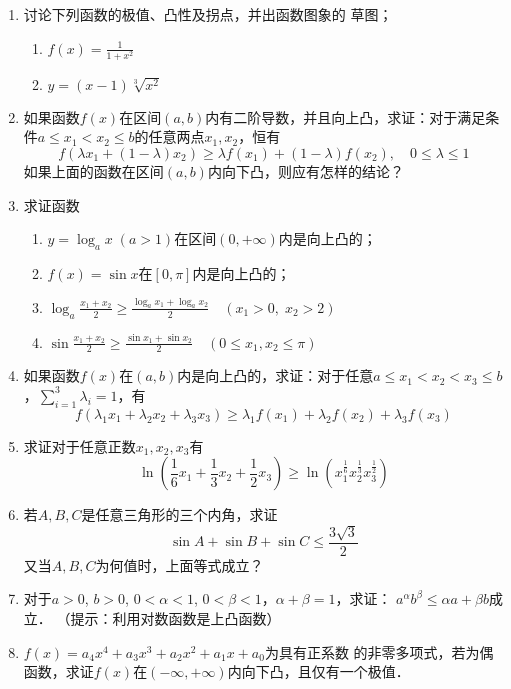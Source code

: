 \begin{ex}
\begin{enumerate}
    \item 讨论下列函数的极值、凸性及拐点，并出函数图象的
    草图；
\begin{multicols}{2}
\begin{enumerate}
    \item $f(x)=\frac{1}{1+x^2}$
    \item $y=(x-1)\sqrt[3]{x^2}$
\end{enumerate}
\end{multicols}
\item 如果函数$f(x)$在区间$(a,b)$内有二阶导数，并且向上凸，求证：对于满足条件$a\le x_1<x_2\le b$的任意两点$x_1,x_2$，恒有
\[f (\lambda x_1+ (1-\lambda) x_2) \ge \lambda f (x_1) + (1-\lambda)f (x_2) ,\quad  0\le\lambda\le 1\]
如果上面的函数在区间$(a,b)$内向下凸，则应有怎样的结论？
\item 求证函数
\begin{enumerate}
    \item $y=\log_ax \; (a>1)$在区间$(0,+\infty)$内是向上凸的；
    \item $f(x)=\sin x$在$[0,\pi]$内是向上凸的；
    \item $\log_a\frac{x_1+x_2}{2}\ge \frac{\log_a x_1+\log_a x_2}{2}\quad (x_1> 0,\; x_2>2)$
    \item $\sin\frac{x_1+x_2}{2}\ge \frac{\sin x_1+\sin x_2}{2}\quad  (0\le x_1,x_2\le \pi)$
\end{enumerate}

\item 如果函数$f(x)$在$(a,b)$内是向上凸的，求证：对于任意$a\le x_1<x_2<x_3\le b$，$\sum^3_{i=1}\lambda_i=1$，有
\[f(\lambda_1x_1+\lambda_2x_2+\lambda_3x_3)\ge \lambda_1f(x_1)+\lambda_2f(x_2)+\lambda_3f(x_3)\]

\item  求证对于任意正数$x_1,x_2,x_3$有
\[\ln\left(\frac{1}{6}x_1+\frac{1}{3}x_2+\frac{1}{2}x_3\right) \ge \ln \left(x_1^{\tfrac{1}{6}}x_2^{\tfrac{1}{3}}x_3^{\tfrac{1}{2}} \right)\]
\item  若$A,B,C$是任意三角形的三个内角，求证
\[\sin A+\sin B+\sin C\le \frac{3\sqrt{3}}{2}\]
又当$A,B,C$为何值时，上面等式成立？
\item  对于$a>0$, $b>0$, $0<\alpha<1$, $0<\beta<1$，$\alpha+\beta=1$，求证：
$a^{\alpha}b^{\beta}\le \alpha a+\beta b$成立．
（提示：利用对数函数是上凸函数）
\item  $f(x)=a_4x^4+a_3x^3+a_2x^2+a_1x+a_0$为具有正系数
的非零多项式，若为偶函数，求证$f(x)$在$(-\infty,+\infty)$内向下凸，且仅有一个极值．
\end{enumerate}
\end{ex}

